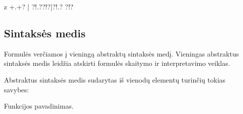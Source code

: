 \documentclass[letterpaper,10pt,lithuanian]{sphinxmanual}
\begin{document}
\begin{sphinxVerbatim}[commandchars=\\\{\}]
\PYGZti{}\PYG{p}{[}z\PYGZus{}\PYG{p}{]}\PYG{p}{[}\PYGZus{}\PYG{p}{]}
\PYGZti{}\PYGZbs{}+\PYGZbs{}.\PYGZbs{}+?
\PYGZti{}|\PYG{p}{[}\PYGZhy{}\PYG{p}{]}\PYGZbs{}
\PYGZti{}?!.??\PYGZlt{}!\PYGZbs{}\PYGZbs{}\PYGZbs{}\PYGZbs{}\PYGZbs{}\PYGZbs{}?\PYGZdq{}|\PYGZsq{}?!\PYGZsq{}\PYGZsq{}.?
?\PYGZlt{}!\PYGZbs{}\PYGZbs{}\PYGZbs{}\PYGZbs{}\PYGZbs{}\PYGZbs{}?\PYGZsq{}
\end{sphinxVerbatim}


\subsection{Sintaksės medis}
\label{\detokenize{formules:sintakses-medis}}
\sphinxAtStartPar
Formulės verčiamos į vieningą abstraktų sintaksės medį. Vieningas abstraktus
sintaksės medis leidžia atskirti formulės skaitymo ir interpretavimo veiklas.

\sphinxAtStartPar
Abstraktus sintaksės medis sudarytas iš vienodų elementų turinčių tokias
savybes:


\begin{fulllineitems}

\pysigstartsignatures
{}
\pysigstopsignatures
\sphinxAtStartPar
Funkcijos pavadinimas.

\end{fulllineitems}
\end{document}
